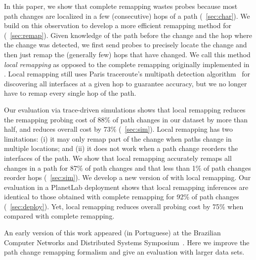 In this paper, we show that complete remapping wastes probes because
most path changes are localized in a few (consecutive) hops of a path
(\secstr~\ref{sec:char}). We build on this observation to develop a more
efficient remapping method for \dtrack{} (\secstr~\ref{sec:remap}).
Given knowledge of the path before the change and the hop where the
change was detected, we first send probes to precisely locate the change and then
just remap the (generally few) hops that have changed. We call this
method \textit{local remapping} as opposed to the complete remapping
originally implemented in \dtrack{}. Local remapping still uses Paris
traceroute's multipath detection algorithm~\cite{veitch09balancer} for
discovering all interfaces at a given hop to guarantee accuracy, but we
no longer have to remap every single hop of the path.

Our evaluation via trace-driven simulations shows that local remapping
reduces the remapping probing cost of 88\% of path changes in our dataset by
more than half, and reduces overall cost by 73\% (\secstr~\ref{sec:sim}).
Local remapping has two  limitations: (i) it may only remap part of the
change when paths change in multiple locations; and (ii)  it does not
work when a path change reorders the interfaces of the path.  We show
that local remapping accurately remaps all changes in a path for 87\%
of path changes and that less than 1\% of path changes reorder hops
(\secstr~\ref{sec:sim}).  We develop a new version of \dtrack{} with
local remapping.  Our evaluation in a PlanetLab deployment shows that
local remapping inferences are identical to those obtained with complete
remapping for 92\% of path changes (\secstr~\ref{sec:deploy}). Yet,
local remapping reduces overall probing cost by 75\% when compared with
complete remapping.
\pagebreak

An early version of this work appeared (in Portuguese) at the Brazilian
Computer Networks and Distributed Systems Symposium~\cite{cunha13remap}.
Here we improve the path change remapping formalism and give an
evaluation with larger data sets.


%

